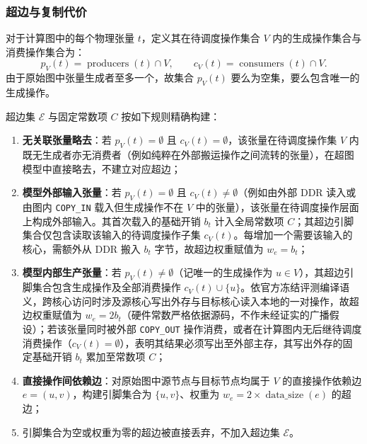 \documentclass[anonymous,withtoc]{gmcm2026}
\providecommand{\tightlist}{\setlength{\itemsep}{0pt}\setlength{\parskip}{0pt}}
\begin{document}
\subsubsection{超边与复制代价}

对于计算图中的每个物理张量 \(t\)，定义其在待调度操作集合 \(V\) 内的生成操作集合与消费操作集合为： \begin{equation}
p_V(t) = \operatorname{producers}(t) \cap V, \qquad c_V(t) = \operatorname{consumers}(t) \cap V.
\end{equation} 由于原始图中张量生成者至多一个，故集合 \(p_V(t)\) 要么为空集，要么包含唯一的生成操作。

超边集 \(\mathcal{E}\) 与固定常数项 \(C\) 按如下规则精确构建：

\begin{enumerate}
\def\labelenumi{\arabic{enumi}.}
\tightlist
\item
  \textbf{无关联张量略去}：若 \(p_V(t) = \emptyset\) 且 \(c_V(t) = \emptyset\)，该张量在待调度操作集 \(V\) 内既无生成者亦无消费者（例如纯粹在外部搬运操作之间流转的张量），在超图模型中直接略去，不建立对应超边；
\item
  \textbf{模型外部输入张量}：若 \(p_V(t) = \emptyset\) 且 \(c_V(t) \ne \emptyset\)（例如由外部 DDR 读入或由图内 \texttt{COPY\_IN} 载入但生成操作不在 \(V\) 中的张量），该张量在待调度操作层面上构成外部输入。其首次载入的基础开销 \(b_t\) 计入全局常数项 \(C\)；其超边引脚集合仅包含读取该输入的待调度操作子集 \(c_V(t)\)。每增加一个需要该输入的核心，需额外从 DDR 搬入 \(b_t\) 字节，故超边权重赋值为 \(w_e = b_t\)；
\item
  \textbf{模型内部生产张量}：若 \(p_V(t) \ne \emptyset\)（记唯一的生成操作为 \(u \in V\)），其超边引脚集合包含生成操作及全部消费操作 \(c_V(t) \cup \{u\}\)。依官方冻结评测编译语义，跨核心访问时涉及源核心写出外存与目标核心读入本地的一对操作，故超边权重赋值为 \(w_e = 2b_t\)（硬件常数严格依据源码，不作未经证实的广播假设）；若该张量同时被外部 \texttt{COPY\_OUT} 操作消费，或者在计算图内无后继待调度消费操作（\(c_V(t) = \emptyset\)），表明其结果必须写出至外部主存，其写出外存的固定基础开销 \(b_t\) 累加至常数项 \(C\)；
\item
  \textbf{直接操作间依赖边}：对原始图中源节点与目标节点均属于 \(V\) 的直接操作依赖边 \(e = (u, v)\)，构建引脚集合为 \(\{u, v\}\)、权重为 \(w_e = 2 \times \operatorname{data\_size}(e)\) 的超边；
\item
  引脚集合为空或权重为零的超边被直接丢弃，不加入超边集 \(\mathcal{E}\)。
\end{enumerate}
\end{document}
